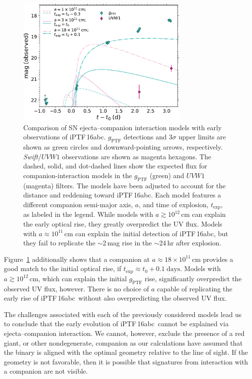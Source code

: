 \documentclass[twocolumn]{aastex61}
\newcommand{\abc}{iPTF\,16abc}
\begin{document}
\begin{figure}[!thb]
  \centering
  \includegraphics[width=3.35in]{companion_lc.pdf}
  \caption{Comparison of SN ejecta--companion interaction models with early
  observations of \abc. $g_\mathrm{PTF}$ detections and 3$\sigma$ upper
  limits are shown as green circles and downward-pointing arrows,
  respectively. \textit{Swift}/$UVW1$ observations are shown as magenta
  hexagons. The dashed, solid, and dot-dashed lines show the expected flux
  for companion-interaction models in the $g_\mathrm{PTF}$ (green) and
  $UVW1$ (magenta) filters. The models have been adjusted to account for the
  distance and reddening toward \abc. Each model features a different
  companion semi-major axis, $a$, and time of explosion, $t_\mathrm{exp}$,
  as labeled in the legend. While models with $a \gtrsim 10^{12} \,
  \mathrm{cm}$ can explain the early optical rise, they greatly overpredict
  the UV flux. Models with $a \approx 10^{11} \, \mathrm{cm}$ can explain
  the initial detection of \abc, but they fail to replicate the $\sim$2\,mag
  rise in the $\sim$24\,hr after explosion. }
  \label{fig:SN--companion}
\end{figure}

Figure~\ref{fig:SN--companion} additionally shows that a companion at $a
\approx 18 \times 10^{11} \, \mathrm{cm}$ provides a good match to the
initial optical rise, if $t_\mathrm{exp} \approx t_0 + 0.1 \;
\mathrm{days}$. Models with $a \gtrsim 10^{12} \, \mathrm{cm}$, which can
explain the initial $g_\mathrm{PTF}$ rise, significantly overpredict the
observed UV flux, however. There is no choice of $a$ capable of replicating
the early rise of \abc\ without also overpredicting the observed UV flux.

The challenges associated with each of the previously considered models lead
us to conclude that the early evolution of \abc\ cannot be explained via
ejecta--companion interaction. We cannot, however, exclude the presence of a
red giant, or other nondegenerate, companion as our calculations have
assumed that the binary is aligned with the optimal geometry relative to the
line of sight. If the geometry is not favorable, then it is possible that
signatures from interaction with a companion are not visible.
\end{document}
